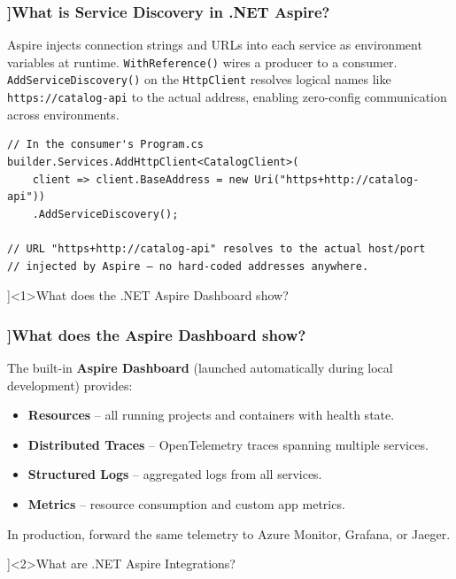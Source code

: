 \begin{frame}[fragile]
  \frametitle{\AnswerTitle[\CategoryBadge[AspireColor!20]{.NET Aspire}]{What is Service Discovery in .NET Aspire?}}

  {\footnotesize
  Aspire injects connection strings and URLs into each service as environment variables at runtime. \texttt{WithReference()} wires a producer to a consumer. \texttt{AddServiceDiscovery()} on the \texttt{HttpClient} resolves logical names like \texttt{https://catalog-api} to the actual address, enabling zero-config communication across environments.
  }

  \begin{verbatim}
// In the consumer's Program.cs
builder.Services.AddHttpClient<CatalogClient>(
    client => client.BaseAddress = new Uri("https+http://catalog-api"))
    .AddServiceDiscovery();

// URL "https+http://catalog-api" resolves to the actual host/port
// injected by Aspire — no hard-coded addresses anywhere.
  \end{verbatim}
\end{frame}

\QuestionSlide[\CategoryBadge[AspireColor!20]{.NET Aspire}]<1>{What does the .NET Aspire Dashboard show?}

\begin{frame}[fragile]
  \frametitle{\AnswerTitle[\CategoryBadge[AspireColor!20]{.NET Aspire}]{What does the Aspire Dashboard show?}}

  {\footnotesize
  The built-in \textbf{Aspire Dashboard} (launched automatically during local development) provides:
  \begin{itemize}
    \item \textbf{Resources} – all running projects and containers with health state.
    \item \textbf{Distributed Traces} – OpenTelemetry traces spanning multiple services.
    \item \textbf{Structured Logs} – aggregated logs from all services.
    \item \textbf{Metrics} – resource consumption and custom app metrics.
  \end{itemize}
  In production, forward the same telemetry to Azure Monitor, Grafana, or Jaeger.
  }
\end{frame}

\QuestionSlide[\CategoryBadge[AspireColor!20]{.NET Aspire}]<2>{What are .NET Aspire Integrations?}

